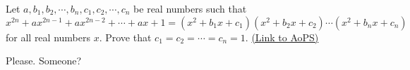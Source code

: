 \begin{problem}
	Let $a,b_1,b_2, \cdots,b_n,c_1,c_2,\cdots,c_n$ be real numbers such that
\[x^{2n} + ax^{2n-1} + ax^{2n-2} + \cdots +ax + 1 = (x^2+b_1x+c_1)(x^2+b_2x+c_2) \cdots  (x^2+b_nx+c_n) \]
for all real numbers $x$. Prove that $c_1=c_2=\cdots  = c_n=1$.
	\flushright \href{https://artofproblemsolving.com/community/c6h397283}{(Link to AoPS)}
\end{problem}



\begin{solution}
	Please. Someone?
\end{solution}



